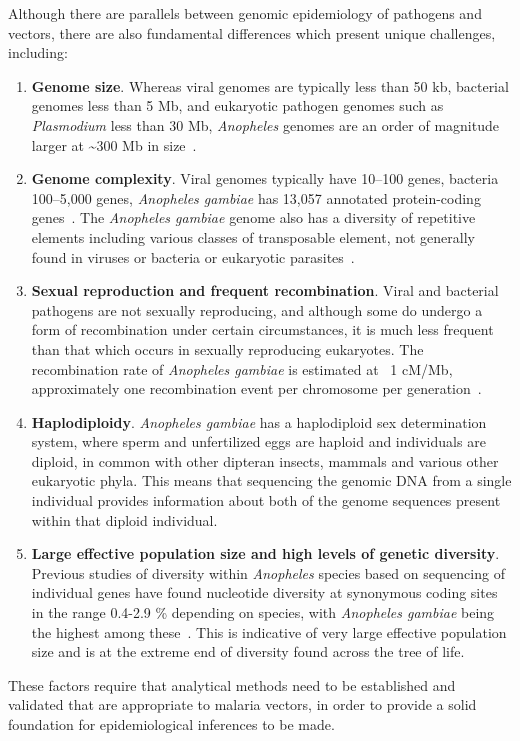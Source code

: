 \begin{refsection}
Although there are parallels between genomic epidemiology of pathogens and vectors, there are also fundamental differences which present unique challenges, including:
%
\begin{enumerate}
%
\item \textbf{Genome size}.
%
Whereas viral genomes are typically less than 50 kb, bacterial genomes less than 5 Mb, and eukaryotic pathogen genomes such as \textit{Plasmodium} less than 30 Mb, \textit{Anopheles} genomes are an order of magnitude larger at \textasciitilde 300 Mb in size~\parencite{Neafsey2015}.
%
\item \textbf{Genome complexity}.
%
Viral genomes typically have 10--100 genes, bacteria 100--5,000 genes, \textit{Anopheles gambiae} has 13,057 annotated protein-coding genes~\parencite{AgamP4.12,GiraldoCalderon2015}.
%
The \textit{Anopheles gambiae} genome also has a diversity of repetitive elements including various classes of transposable element, not generally found in viruses or bacteria or eukaryotic parasites~\parencite{Tu2004,FernandezMedina2011}.
%
\item \textbf{Sexual reproduction and frequent recombination}.
%
Viral and bacterial pathogens are not sexually reproducing, and although some do undergo a form of recombination under certain circumstances, it is much less frequent than that which occurs in sexually reproducing eukaryotes.
%
The recombination rate of \textit{Anopheles gambiae} is estimated at ~1 cM/Mb, approximately one recombination event per chromosome per generation~\parencite{Pombi2006}.
%
\item \textbf{Haplodiploidy}. 
%
\textit{Anopheles gambiae} has a haplodiploid sex determination system, where sperm and unfertilized eggs are haploid and individuals are diploid, in common with other dipteran insects, mammals and various other eukaryotic phyla.
%
This means that sequencing the genomic DNA from a single individual provides information about both of the genome sequences present within that diploid individual.
%
\item \textbf{Large effective population size and high levels of genetic diversity}.
%
Previous studies of diversity within \textit{Anopheles} species based on sequencing of individual genes have found nucleotide diversity at synonymous coding sites in the range 0.4-2.9 \% depending on species, with \textit{Anopheles gambiae} being the highest among these~\parencite{Leffler2012}.
%
This is indicative of very large effective population size and is at the extreme end of diversity found across the tree of life.
%
\end{enumerate}
%
These factors require that analytical methods need to be established and validated that are appropriate to malaria vectors, in order to provide a solid foundation for epidemiological inferences to be made.



\end{refsection}

